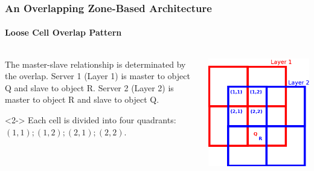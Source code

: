 \begin{frame}[fragile]
\frametitle{An Overlapping Zone-Based Architecture}
\framesubtitle{Loose Cell Overlap Pattern}
\begin{columns}

\begin{column}{0.5\textwidth}
\begin{block}{The master-slave relationship is determinated by the overlap.}
Server 1 (Layer 1) is master to object Q and slave to object R.
Server 2 (Layer 2) is master to object R and slave to object Q.
\end{block}
\begin{block}{}<2->
Each cell is divided into four quadrants: $(1,1); (1,2); (2,1); (2,2)$.
\end{block}
\end{column}

\begin{column}{0.5\textwidth}
\begin{center}
\includegraphics[scale=.80]{celloverlap.png}
\end{center}
\end{column}

\end{columns}
\end{frame}


